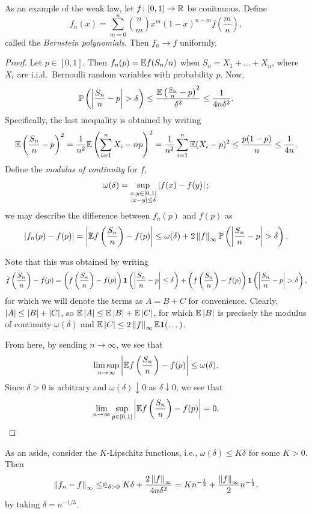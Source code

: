 As an example of the weak law, let $f \colon [0, 1] \to \mathbb R$ be conitnuous. Define
\[ f_n(x) = \sum_{m=0}^n \binom{n}{m} x^m (1 - x)^{n-m} f\left(\frac{m}{n}\right), \]
called the \textit{Bernstein polynomials}. Then $f_n \to f$ uniformly.
\begin{proof}
    Let $p \in [0, 1]$. Then $f_n(p) = \mathbb E f(S_n/n)$ when $S_n = X_1 + \dots + X_n$, where $X_i$ are i.i.d.\ Bernoulli random variables with probability $p$. Now,
    \[ \mathbb P \left(\left\lvert \frac{S_n}{n} - p \right\rvert > \delta\right) \leq \frac{\mathbb E\left(\frac{S_n}{n} - p\right)^2}{\delta^2} \leq \frac{1}{4n\delta^2}. \]
    Specifically, the last inequality is obtained by writing
    \[ \mathbb E \left(\frac{S_n}{n} - p\right)^2 = \frac{1}{n^2} \mathbb E \left(\sum_{i=1}^n X_i - np\right)^2 = \frac{1}{n^2} \sum_{i=1}^n \mathbb E(X_i - p)^2 \leq \frac{p(1 - p)}{n} \leq \frac{1}{4n}. \]
    Define the \textit{modulus of continuity} for $f$,
    \[ \omega(\delta) = \sup_{\substack{x,y \in [0, 1] \\ \left\lvert x - y \right\rvert \leq \delta}} \left\lvert f(x) - f(y) \right\rvert; \]
    we may describe the difference between $f_n(p)$ and $f(p)$ as
    \[ \left\lvert f_n(p) - f(p) \right\rvert = \left\lvert \mathbb E f\left(\frac{S_n}{n}\right) - f(p) \right\rvert \leq \omega(\delta) + 2 \left\lVert f \right\rVert_\infty \mathbb P\left(\left\lvert \frac{S_n}{n} - p \right\rvert > \delta\right). \]

    \newpage
    Note that this was obtained by writing
    \[ f\left(\frac{S_n}{n}\right) - f(p) = \left(f\left(\frac{S_n}{n}\right) - f(p)\right) \mathbf 1 \left(\left\lvert \frac{S_n}{n} - p \right\rvert \leq \delta\right) + \left(f\left(\frac{S_n}{n}\right) - f(p)\right) \mathbf 1 \left(\left\lvert \frac{S_n}{n} - p \right\rvert > \delta\right), \]
    for which we will denote the terms as $A = B + C$ for convenience. Clearly, $\left\lvert A \right\rvert \leq \left\lvert B \right\rvert + \left\lvert C \right\rvert$, so $\mathbb E \left\lvert A \right\rvert \leq \mathbb E \left\lvert B \right\rvert + \mathbb E \left\lvert C \right\rvert$, for which $\mathbb E \left\lvert B \right\rvert$ is precisely the modulus of continuity $\omega(\delta)$ and $\mathbb E \left\lvert C \right\rvert \leq 2 \left\lVert f \right\rVert_\infty \mathbb E \mathbf 1 (\dots)$.

    From here, by sending $n \to \infty$, we see that
    \[ \limsup_{n \to \infty} \left\lvert \mathbb E f\left(\frac{S_n}{n}\right) - f(p) \right\rvert \leq \omega(\delta). \]
    Since $\delta > 0$ is arbitrary and $\omega(\delta) \downarrow 0$ as $\delta \downarrow 0$, we see that
    \[ \lim_{n \to \infty} \sup_{p \in [0, 1]} \left\lvert \mathbb E f\left(\frac{S_n}{n}\right) - f(p) \right\rvert = 0. \qedhere \]
\end{proof}

As an aside, consider the $K$-Lipschitz functions, i.e., $\omega(\delta) \leq K\delta$ for some $K > 0$. Then
\[ \left\lVert f_n - f \right\rVert_\infty \leq \in_{\delta > 0} K \delta + \frac{2 \left\lVert f \right\rVert_\infty}{4n \delta^2} = Kn^{-\frac{1}{3}} + \frac{\left\lVert f \right\rVert_\infty}{2} n^{-\frac{1}{3}}, \]
by taking $\delta = n^{-1/3}$.

